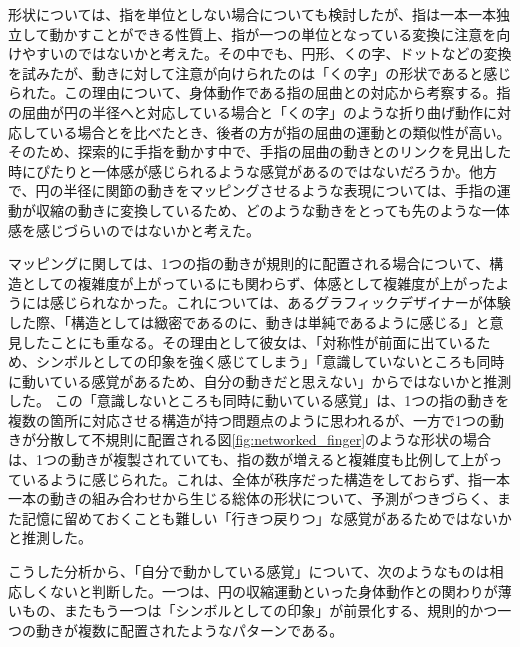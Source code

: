 形状については、指を単位としない場合についても検討したが、指は一本一本独立して動かすことができる性質上、指が一つの単位となっている変換に注意を向けやすいのではないかと考えた。その中でも、円形、くの字、ドットなどの変換を試みたが、動きに対して注意が向けられたのは「くの字」の形状であると感じられた。この理由について、身体動作である指の屈曲との対応から考察する。指の屈曲が円の半径へと対応している場合と「くの字」のような折り曲げ動作に対応している場合とを比べたとき、後者の方が指の屈曲の運動との類似性が高い。そのため、探索的に手指を動かす中で、手指の屈曲の動きとのリンクを見出した時にぴたりと一体感が感じられるような感覚があるのではないだろうか。他方で、円の半径に関節の動きをマッピングさせるような表現については、手指の運動が収縮の動きに変換しているため、どのような動きをとっても先のような一体感を感じづらいのではないかと考えた。



マッピングに関しては、1つの指の動きが規則的に配置される場合について、構造としての複雑度が上がっているにも関わらず、体感として複雑度が上がったようには感じられなかった。これについては、あるグラフィックデザイナーが体験した際、「構造としては緻密であるのに、動きは単純であるように感じる」と意見したことにも重なる。その理由として彼女は、「対称性が前面に出ているため、シンボルとしての印象を強く感じてしまう」「意識していないところも同時に動いている感覚があるため、自分の動きだと思えない」からではないかと推測した。
この「意識しないところも同時に動いている感覚」は、1つの指の動きを複数の箇所に対応させる構造が持つ問題点のように思われるが、一方で1つの動きが分散して不規則に配置される図\ref{fig:networked_finger}のような形状の場合は、1つの動きが複製されていても、指の数が増えると複雑度も比例して上がっているように感じられた。これは、全体が秩序だった構造をしておらず、指一本一本の動きの組み合わせから生じる総体の形状について、予測がつきづらく、また記憶に留めておくことも難しい「行きつ戻りつ」な感覚があるためではないかと推測した。

こうした分析から、「自分で動かしている感覚」について、次のようなものは相応しくないと判断した。一つは、円の収縮運動といった身体動作との関わりが薄いもの、またもう一つは「シンボルとしての印象」が前景化する、規則的かつ一つの動きが複数に配置されたようなパターンである。

